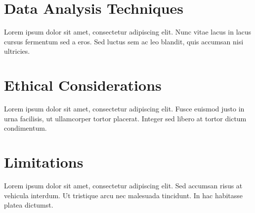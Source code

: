 \section{Data Analysis Techniques}
Lorem ipsum dolor sit amet, consectetur adipiscing elit. Nunc vitae lacus in lacus cursus fermentum sed a eros. Sed luctus sem ac leo blandit, quis accumsan nisi \cite{smith2020understanding}ultricies.

\section{Ethical Considerations}
Lorem ipsum dolor sit amet, consectetur adipiscing elit. Fusce euismod justo in urna facilisis,\cite{doe2021impact} ut ullamcorper tortor placerat. Integer sed libero at tortor dictum condimentum.

\section{Limitations}
Lorem ipsum dolor sit amet, consectetur adipiscing elit. Sed accumsan risus at vehicula interdum. Ut tristique arcu nec malesuada tincidunt. In hac habitasse platea dictumst.